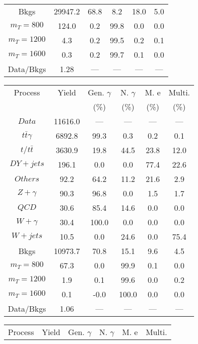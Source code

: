 \begin{figure}
\begin{minipage}[c]{0.32\textwidth}
{\begin{tabular}{cccccc}
Bkgs &  29947.2 &  68.8 &  8.2 &  18.0 &  5.0\\
$ m_{T} = 800 $ &  124.0 &  0.2 &  99.8 &  0.0 &  0.0\\
$ m_{T} = 1200 $ &  4.3 &  0.2 &  99.5 &  0.2 &  0.1\\
$ m_{T} = 1600 $ &  0.3 &  0.2 &  99.7 &  0.1 &  0.0\\
Data/Bkgs &  1.28 &  --- &  --- &  --- &  ---\\
\hline
\end{tabular}
}
\end{minipage}
\begin{minipage}[c]{0.32\textwidth}
\centering
\tiny{
\begin{tabular}{cccccc}
\hline
Process & Yield & Gen. $\gamma$ & N. $\gamma$ & M. e & Multi. \\
 &  & (\%) & (\%) & (\%) & (\%)  \\
\hline
                                                                      $ Data $ &  11616.0 &  --- &  --- &  --- &  ---\\
$ t\bar{t}\gamma $ &  6892.8 &  99.3 &  0.3 &  0.2 &  0.1\\
$ t/t\bar{t} $ &  3630.9 &  19.8 &  44.5 &  23.8 &  12.0\\
$ DY+jets $ &  196.1 &  0.0 &  0.0 &  77.4 &  22.6\\
$ Others $ &  92.2 &  64.2 &  11.2 &  21.6 &  2.9\\
$ Z+\gamma $ &  90.3 &  96.8 &  0.0 &  1.5 &  1.7\\
$ QCD $ &  30.6 &  85.4 &  14.6 &  0.0 &  0.0\\
$ W+\gamma $ &  30.4 &  100.0 &  0.0 &  0.0 &  0.0\\
$ W+jets $ &  10.5 &  0.0 &  24.6 &  0.0 &  75.4\\
Bkgs &  10973.7 &  70.8 &  15.1 &  9.6 &  4.5\\
$ m_{T} = 800 $ &  67.3 &  0.0 &  99.9 &  0.1 &  0.0\\
$ m_{T} = 1200 $ &  1.9 &  0.1 &  99.6 &  0.0 &  0.2\\
$ m_{T} = 1600 $ &  0.1 &  -0.0 &  100.0 &  0.0 &  0.0\\
Data/Bkgs &  1.06 &  --- &  --- &  --- &  ---\\
\hline
\end{tabular}
}
\end{minipage}
\begin{minipage}[c]{0.32\textwidth}
\centering
\tiny{
\begin{tabular}{cccccc}
\hline
Process & Yield & Gen. $\gamma$ & N. $\gamma$ & M. e & Multi. \\

\end{tabular}}
\end{minipage}
\end{figure}
